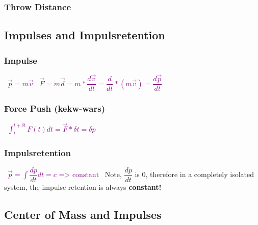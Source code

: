 \documentclass[main.tex,fontsize=8pt,paper=a4,paper=portrait,DIV=calc,]{scrartcl}
\begin{document}
\begin{multicols*}{2}
\subsubsection{Throw Distance}

\subsection{Impulses and Impulsretention}

\subsubsection{Impulse}
\, \newline
\large \textcolor{purple}{\( \vec{p} = m\vec{v} \)}\newline
\, \newline
\textcolor{purple}{\( \vec{F} = m\vec{d} = m * \dfrac{d\vec{v}}{dt} = \dfrac{d}{dt} * (m\vec{v}) = \dfrac{d\vec{p}}{dt} \)}\newline
\normalsize \, \newline

\subsubsection{Force Push (kekw-wars)}
\, \newline
\large \textcolor{purple}{ \(\int^{t+\delta t}_{t} F(t) dt = \vec{F}* \delta t = \delta p\)}\newline
\normalsize \, \newline

\subsubsection{Impulsretention}
\, \newline
\large \textcolor{purple}{ \( \vec{p} = \int \dfrac{dp}{dt} dt = c \text{ => constant}\)}\newline
\Large \, \newline
Note, \(\dfrac{dp}{dt}\) is 0, therefore in a completely isolated system, the impulse retention is always \textbf{constant!} \normalsize \newline


\subsection{Center of Mass and Impulses} 

\end{multicols*}
\end{document}
